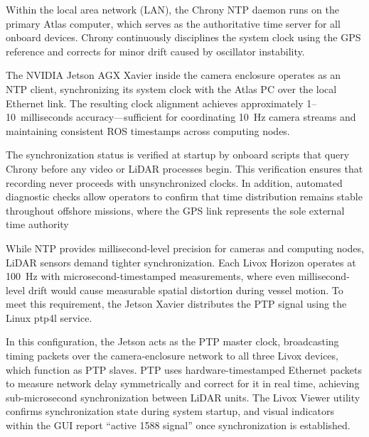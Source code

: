 \documentclass[../main.tex]{subfiles}
\begin{document}
Within the local area network (LAN), the Chrony \ac{NTP} daemon runs on the primary Atlas computer, which serves as the authoritative time server for all onboard devices. Chrony continuously disciplines the system clock using the GPS reference and corrects for minor drift caused by oscillator instability.

The NVIDIA Jetson AGX Xavier inside the camera enclosure operates as an \ac{NTP} client, synchronizing its system clock with the Atlas PC over the local Ethernet link. The resulting clock alignment achieves approximately 1–10~milliseconds accuracy—sufficient for coordinating 10~Hz camera streams and maintaining consistent ROS timestamps across computing nodes.

The synchronization status is verified at startup by onboard scripts that query Chrony before any video or LiDAR processes begin. This verification ensures that recording never proceeds with unsynchronized clocks. In addition, automated diagnostic checks allow operators to confirm that time distribution remains stable throughout offshore missions, where the GPS link represents the sole external time authority

While \ac{NTP} provides millisecond-level precision for cameras and computing nodes, LiDAR sensors demand tighter synchronization. Each Livox Horizon operates at 100~Hz with microsecond-timestamped measurements, where even millisecond-level drift would cause measurable spatial distortion during vessel motion. To meet this requirement, the Jetson Xavier distributes the \ac{PTP} signal using the Linux ptp4l service.

In this configuration, the Jetson acts as the \ac{PTP} master clock, broadcasting timing packets over the camera-enclosure network to all three Livox devices, which function as \ac{PTP} slaves. \ac{PTP} uses hardware-timestamped Ethernet packets to measure network delay symmetrically and correct for it in real time, achieving sub-microsecond synchronization between LiDAR units. The Livox Viewer utility confirms synchronization state during system startup, and visual indicators within the GUI report “active 1588 signal” once synchronization is established.
\end{document}
